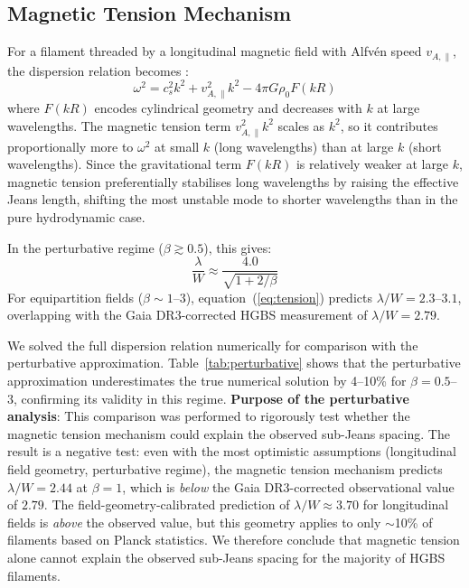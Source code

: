 \documentclass[twoside,twocolumn]{mnras}
\begin{document}
\subsection{Magnetic Tension Mechanism}

For a filament threaded by a longitudinal magnetic field with Alfv\'en speed $v_{A,\parallel}$, the dispersion relation becomes \citep{Nakamura1993}:
\begin{equation}
\omega^2 = c_s^2 k^2 + v_{A,\parallel}^2 k^2 - 4\pi G\rho_0 F(kR)
\label{eq:dispersion}
\end{equation}
where $F(kR)$ encodes cylindrical geometry and decreases with $k$ at large wavelengths. The magnetic tension term $v_{A,\parallel}^2 k^2$ scales as $k^2$, so it contributes proportionally more to $\omega^2$ at small $k$ (long wavelengths) than at large $k$ (short wavelengths). Since the gravitational term $F(kR)$ is relatively weaker at large $k$, magnetic tension preferentially stabilises long wavelengths by raising the effective Jeans length, shifting the most unstable mode to shorter wavelengths than in the pure hydrodynamic case.

In the perturbative regime ($\beta \gtrsim 0.5$), this gives:
\begin{equation}
\frac{\lambda}{W} \approx \frac{4.0}{\sqrt{1 + 2/\beta}}
\label{eq:tension}
\end{equation}
For equipartition fields ($\beta \sim 1$--$3$), equation~(\ref{eq:tension}) predicts $\lambda/W = 2.3$--$3.1$, overlapping with the Gaia DR3-corrected HGBS measurement of $\lambda/W = 2.79$.

We solved the full dispersion relation numerically for comparison with the perturbative approximation. Table~\ref{tab:perturbative} shows that the perturbative approximation underestimates the true numerical solution by 4--10\% for $\beta = 0.5$--$3$, confirming its validity in this regime. \textbf{Purpose of the perturbative analysis}: This comparison was performed to rigorously test whether the magnetic tension mechanism could explain the observed sub-Jeans spacing. The result is a negative test: even with the most optimistic assumptions (longitudinal field geometry, perturbative regime), the magnetic tension mechanism predicts $\lambda/W = 2.44$ at $\beta = 1$, which is {\it below} the Gaia DR3-corrected observational value of $2.79$. The field-geometry-calibrated prediction of $\lambda/W \approx 3.70$ for longitudinal fields is {\it above} the observed value, but this geometry applies to only $\sim$10\% of filaments based on Planck statistics. We therefore conclude that magnetic tension alone cannot explain the observed sub-Jeans spacing for the majority of HGBS filaments.
\end{document}
